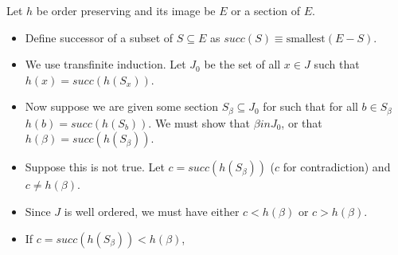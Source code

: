 \documentclass{article}
\begin{document}
 Let $h$ be order preserving and its image be $E$ or a section of $E$. 
\begin{itemize}
\item Define successor of a subset of $S \subseteq E$ as $succ(S) \equiv \text{smallest}(E - S)$.
\item We use transfinite induction. Let $J_0$ be the set of all $x \in J$ such that $h(x) = succ(h(S_x))$.
\item Now suppose we are given some section $S_\beta \subseteq J_0$ for such that for all $b \in S_\beta$ $h(b) = succ(h(S_b))$. We must show
that $\beta in J_0$, or that $h(\beta) = succ(h(S_\beta))$.
\item Suppose this is not true. Let $c = succ(h(S_\beta))$ ($c$ for contradiction) and $c \neq h(\beta)$.
\item Since $J$ is well ordered, we must have either $c < h(\beta)$ or $c > h(\beta)$.
\item If $c = succ(h(S_\beta)) < h(\beta)$, 
\end{itemize}
\end{document}
